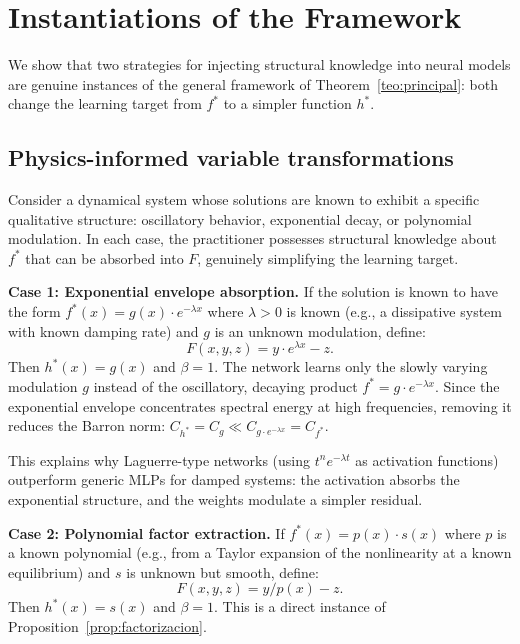 \documentclass[12pt]{article}
\begin{document}
\section{Instantiations of the Framework}
\label{sec:instances}

We show that two strategies for injecting structural knowledge into
neural models are genuine instances of the general framework of
Theorem~\ref{teo:principal}: both change the learning target from
$f^*$ to a simpler function $h^*$.

\subsection{Physics-informed variable transformations}
\label{sec:variable_transform}

Consider a dynamical system whose solutions are known to exhibit a
specific qualitative structure: oscillatory behavior, exponential
decay, or polynomial modulation.
In each case, the practitioner possesses structural knowledge about
$f^*$ that can be absorbed into $F$, genuinely simplifying the
learning target.

\textbf{Case 1: Exponential envelope absorption.}
If the solution is known to have the form
$f^*(x) = g(x) \cdot e^{-\lambda x}$ where $\lambda > 0$ is known
(e.g., a dissipative system with known damping rate) and $g$ is an
unknown modulation, define:
\begin{equation}
  F(x, y, z) = y \cdot e^{\lambda x} - z.
\end{equation}
Then $h^*(x) = g(x)$ and $\beta = 1$.
The network learns only the slowly varying modulation $g$ instead
of the oscillatory, decaying product $f^* = g \cdot e^{-\lambda x}$.
Since the exponential envelope concentrates spectral energy at high
frequencies, removing it reduces the Barron norm:
$C_{h^*} = C_g \ll C_{g \cdot e^{-\lambda x}} = C_{f^*}$.

This explains why Laguerre-type networks (using $t^n e^{-\lambda t}$
as activation functions) outperform generic MLPs for damped systems:
the activation absorbs the exponential structure, and the weights
modulate a simpler residual.

\textbf{Case 2: Polynomial factor extraction.}
If $f^*(x) = p(x) \cdot s(x)$ where $p$ is a known polynomial
(e.g., from a Taylor expansion of the nonlinearity at a known
equilibrium) and $s$ is unknown but smooth, define:
\begin{equation}
  F(x, y, z) = y / p(x) - z.
\end{equation}
Then $h^*(x) = s(x)$ and $\beta = 1$.
This is a direct instance of Proposition~\ref{prop:factorizacion}.
\end{document}
